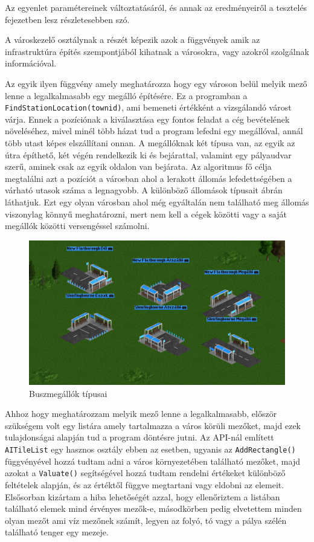 Az egyenlet paramétereinek változtatásáról, és annak az eredményeiről a tesztelés fejezetben lesz részletesebben szó.


A városkezelő osztálynak a részét képezik azok a függvények amik az infrastruktúra építés szempontjából kihatnak a városokra, vagy azokról szolgálnak információval.

Az egyik ilyen függvény amely meghatározza hogy egy városon belül melyik mező lenne a legalkalmasabb egy megálló építésére. Ez a programban a \\ \texttt{FindStationLocation(townid)}, ami bemeneti értékként a vizsgálandó várost várja. Ennek a pozíciónak a kiválasztása egy fontos feladat a cég bevételének növeléséhez, mivel minél több házat tud a program lefedni egy megállóval, annál több utast képes elszállítani onnan. A megállóknak két típusa van, az egyik az útra építhető, két végén rendelkezik ki és bejárattal, valamint egy pályaudvar szerű, aminek csak az egyik oldalon van bejárata. Az algoritmus fő célja megtalálni azt a pozíciót a városban ahol a lerakott állomás lefedettségében a várható utasok száma a legnagyobb. A különböző állomások típusait  ábrán láthatjuk. Ezt egy olyan városban ahol még egyáltalán nem található meg állomás viszonylag könnyű meghatározni, mert nem kell a cégek közötti vagy a saját megállók közötti versengéssel számolni.

\begin{figure}
	\centering
	\includegraphics[width=\textwidth]{images/megallok.png}
	\caption{Buszmegállók típusai}
	\label{fig:megallok}
\end{figure}

Ahhoz hogy meghatározzam melyik mező lenne a legalkalmasabb, először szükségem volt egy listára amely tartalmazza a város körüli mezőket, majd ezek tulajdonságai alapján tud a program döntésre jutni. Az API-nál említett \texttt{AITileList} egy hasznos osztály ebben az esetben, ugyanis az \texttt{AddRectangle()} függvényével hozzá tudtam adni a város környezetében található mezőket, majd azokat a \texttt{Valuate()} segítségével hozzá tudtam rendelni értékeket különböző feltételek alapján, és az értéktől függve megtartani vagy eldobni az elemeit. Elsősorban kizártam a hiba lehetőségét azzal, hogy ellenőriztem a listában található elemek mind érvényes mezők-e, másodkörben pedig elvetettem minden olyan mezőt ami víz mezőnek számít, legyen az folyó, tó vagy a pálya szélén található tenger egy mezeje.

